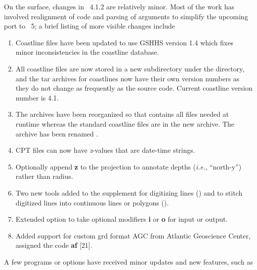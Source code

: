 On the surface, changes in \GMT\ 4.1.2 are relatively minor.  Most of the work has involved
realignment of code and parsing of arguments to simplify the upcoming port to \GMT\ 5;
a brief listing of more visible changes include

\begin{enumerate}
\item Coastline files have been updated to use GSHHS version 1.4 which fixes minor inconsistencies
in the coastline database.
\item All coastline files are now stored in a new subdirectory  under the
 directory, and the tar archives for coastlines now have their own version numbers
as they do not change as frequently as the source code.  Current coastline version number is 4.1.
\item The archives have been reorganized so that  contains all files needed
at runtime whereas the standard coastline files are in the new  archive.
The  archive has been renamed .
\item CPT files can now have \emph{z}-values that are date-time strings.
\item Optionally append \textbf{z} to the  projection to annotate depths (\emph{i.e.}, ``north-y'') rather than radius.
\item Two new tools added to the  supplement for digitizing lines () and
to stitch digitized lines into continuous lines or polygons ().
\item Extended  option to take optional modifiers \textbf{i} or \textbf{o} for input or output.
\item Added support for custom grd format AGC from Atlantic Geoscience Center, assigned the code \textbf{af} [21].
\end{enumerate}

A few programs or options have received minor updates and new features, such as

